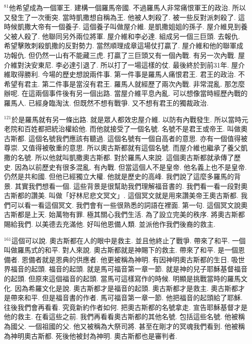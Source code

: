 \documentclass{book}
\begin{document}
$^{81}$他希望成為一個軍王.
建構一個羅馬帝國.
不過羅馬人非常痛恨軍王的政治.
所以又發生了一次衝突.
當時凱撒想自稱為王.
他被人刺殺了.
被一些反對派刺殺了.
這時候凱撒大帝有一個養子.
這個養子叫做屋介維.
是凱撒姐姐的孫子.
屋介維見到養父被人殺了.
他聯同另外兩位將軍.
屋介維和李必達.
組成另一個三巨頭.
去報仇.
希望擊敗刺殺凱撒的反對勢力.
當然順理成章這場仗打贏了.
屋介維和他的聯軍成功報仇.
但仍然一山有不能藏三虎.
打贏了三巨頭又有一個內戰.
有另一次內戰.
屋介維對決安東尼.
李必達引退了.
所以打了一場這樣的仗.
最後終於到前31年.
屋介維取得勝利.
今場的歷史想說兩件事.
第一件事是羅馬人痛恨君王.
君王的政治.
不希望有君主.
第二件事是當沒有君王.
羅馬人就經歷了兩次內戰.
非常混亂.
那怎麼辦呢.
在這兩個事件後有另一個出路.
當屋介維平息內亂.
可以想像當時經歷內戰的羅馬人.
已經身臨淘汰.
但既然不想有戰爭.
又不想有君王的獨裁政治.

$^{121}$於是羅馬就有另一條出路.
就是眾人都效忠屋介維.
以防有內戰發生.
所以當時元老院和百姓都把統治權給他.
而他就接受了一個名號.
名號不是君王或帝王.
叫做奧古斯都.
這個名號我們應該有聽過.
這個名號有一個自高者的意思.
亦有一個值得被尊崇.
又值得被敬重的意思.
所以奧古斯都就有這個名號.
而屋介維也繼承了養父凱撒的名號.
所以他就叫凱撒奧古斯都.
對於羅馬人來說.
這個奧古斯都就承傳了歷史.
因為以前歷史有很多混亂.
有內戰.
但當這個人不是皇帝.
他名義上也不是皇帝.
仍然是共和國.
但他已經獨立大權.
他就是歷史的高峰.
我們說了這麼多羅馬的背景.
其實我們想看一個.
這些背景是很幫助我們理解福音書的.
我們看一看一段對奧古斯都的讚美.
叫做「好林尼悲文冥文」.
這個冥文就是用來讚美帝王奧古斯都.
我們可以看一看這個冥文.
我們會有一些很熟悉的詞語在裡面.
第一句.
這個冥文說奧古斯都是上天.
始萬物有罪.
極其關心我們生活.
為了設立完美的秩序.
將奧古斯都賜給我們.
以美德去充滿他.
好叫他恩備人類.
並派他作我們後裔的救主.

$^{161}$這個可以說.
奧古斯都在人的眼中是救主.
並且他終止了戰爭.
帶來了和平.
一個叫做羅馬式的和平.
對人來說.
奧古斯都就是神賜下的救主.
帶來了和平.
是一個恩備者.
恩備者就是恩典的供應者.
他更被稱為神明.
有因神明奧古斯都的生日.
吸世界福音的起頭.
福音的起頭.
就是馬可福音第一章一節.
就是神的兒子耶穌基督福音的起頭.
但原來這個福音的起頭.
當馬可這樣寫作的時候.
明顯是挑戰當時的羅馬文化.
因為希羅文化是說.
奧古斯都才是福音的起頭.
奧古斯都才是救主.
奧古斯都才是帶來和平.
但是福音書的作者.
馬可福音第一章一節.
他把福音的起頭給了耶穌.
往後我們會再看看.
究竟新約作者如何.
把奧古斯都的名號拿走.
宣告耶穌基督才是他的救主.
在看這些之前.
我們再看看奧古斯都的其他名號.
包括這些名號.
他被稱為國父.
一個祖國的父.
他又被稱為大祭司將.
甚至在剛才的冥魂我們看到.
他被稱為神明奧古斯都.
死後他被封為神明.
奧古斯都也是審判者.
\end{document}

